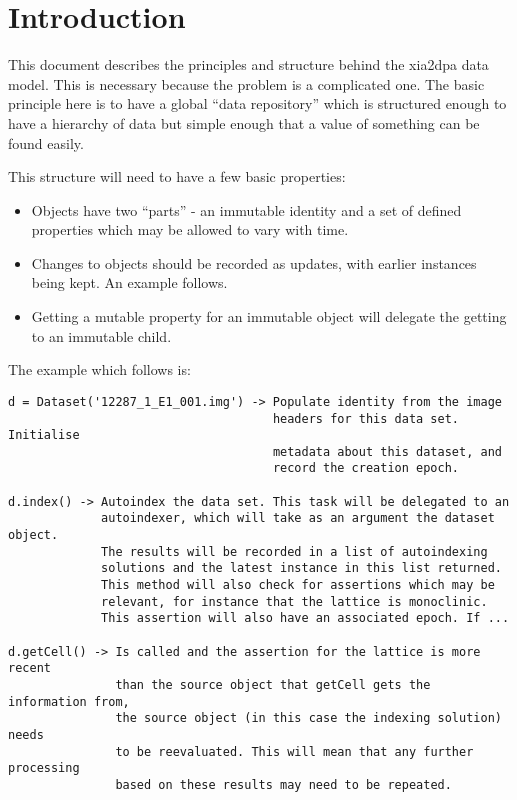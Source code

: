 \documentclass[a4paper, 11pt]{article}
\begin{document}
\section{Introduction}

This document describes the principles and structure behind the xia2dpa 
data model. This is necessary because the problem is a complicated one.
The basic principle here is to have a global ``data repository'' which 
is structured enough to have a hierarchy of data but simple enough that
a value of something can be found easily.

This structure will need to have a few basic properties:

\begin{itemize}
\item{Objects have two ``parts'' - an immutable identity and a set of 
defined properties which may be allowed to vary with time.}
\item{Changes to objects should be recorded as updates, with earlier 
instances being kept. An example follows.}
\item{Getting a mutable property for an immutable object will delegate 
the getting to an immutable child.}
\end{itemize}

The example which follows is:

{
\tiny
\begin{verbatim}
d = Dataset('12287_1_E1_001.img') -> Populate identity from the image
                                     headers for this data set. Initialise
                                     metadata about this dataset, and 
                                     record the creation epoch.

d.index() -> Autoindex the data set. This task will be delegated to an
             autoindexer, which will take as an argument the dataset object.
             The results will be recorded in a list of autoindexing
             solutions and the latest instance in this list returned.
             This method will also check for assertions which may be
             relevant, for instance that the lattice is monoclinic.
             This assertion will also have an associated epoch. If ...

d.getCell() -> Is called and the assertion for the lattice is more recent
               than the source object that getCell gets the information from,
               the source object (in this case the indexing solution) needs
               to be reevaluated. This will mean that any further processing
               based on these results may need to be repeated.
\end{verbatim}
}
\end{document}
